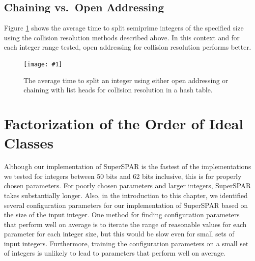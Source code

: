 \documentclass{ucalgthes1}
\theoremstyle{definition}
\newcommand{\set}{\mathcal}
\newcommand{\mygraphX}[4]{
	\begin{figure}[htb]
	\centering
	\texttt{[image: \#1]}
	\caption[#4]{#3}
	\label{#2}
	\end{figure}
}
\begin{document}
\subsection{Chaining vs.\ Open Addressing}

Figure \ref{fig:ssparHashing} shows the average time to split semiprime integers of the specified size using the collision resolution methods described above.  In this context and for each integer range tested, open addressing for collision resolution performs better.

\mygraphX{hashing-open-vs-chained}{fig:ssparHashing}{The average time to split an integer using either open addressing or chaining with list heads for collision resolution in a hash table.}{Open addressing vs Chaining.}

\section{Factorization of the Order of Ideal Classes}
\label{sec:ssparFactorizationOfTheOrder}

\newcommand{\idealDataSet}{\set D}

Although our implementation of SuperSPAR is the fastest of the implementations we tested for integers between 50 bits and 62 bits inclusive, this is for properly chosen parameters.  For poorly chosen parameters and larger integers, SuperSPAR takes substantially longer.  Also, in the introduction to this chapter, we identified several configuration parameters for our implementation of SuperSPAR based on the size of the input integer.  One method for finding configuration parameters that perform well on average is to iterate the range of reasonable values for each parameter for each integer size, but this would be slow even for small sets of input integers.  Furthermore, training the configuration parameters on a small set of integers is unlikely to lead to parameters that perform well on average.  
\end{document}
